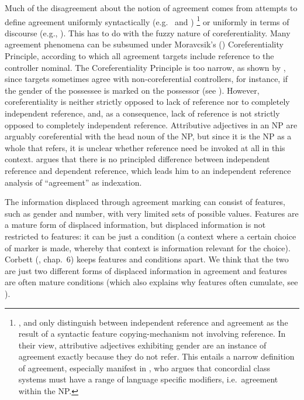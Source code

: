 \documentclass[output=collectionpaper]{langsci/langscibook}
\begin{document}
Much of the disagreement about the notion of agreement comes from attempts to define agreement uniformly syntactically (e.g.\ \citealt{Hengeveld2012} and \citealt{Passer2016b})%
\footnote{%
\cite{Hengeveld2012}, \cite{Rijn2016} and \cite{Passer2016b} only distinguish between independent reference and agreement as the result of a syntactic feature copying-mechanism not involving reference. In their view, attributive adjectives exhibiting gender are an instance of agreement exactly because they do not refer. This entails a narrow definition of agreement, especially manifest in \cite[86]{Passer2016b}, who argues that concordial class systems must have a range of language specific modifiers, i.e.\ agreement within the NP.
} %
or uniformly in terms of discourse (e.g., \citealt{Barlow1999}). This has to do with the fuzzy nature of coreferentiality. Many agreement phenomena can be subsumed under Moravcsik's (\citeyear[363]{Moravcsik1978}) Coreferentiality Principle, according to which all agreement targets include reference to the controller nominal. The Coreferentiality Principle is too narrow, as shown by \cite{Corbett2006}, since targets sometimes agree with non-coreferential controllers, for instance, if the gender of the possessee is marked on the possessor (see ). However, coreferentiality is neither strictly opposed to lack of reference nor to completely independent reference, and, as a consequence, lack of reference is not strictly opposed to completely independent reference. Attributive adjectives in an NP are arguably coreferential with the head noun of the NP, but since it is the NP as a whole that refers, it is unclear whether reference need be invoked at all in this context. \cite{Croft2013} argues that there is no principled difference between independent reference and dependent reference, which leads him to an independent reference analysis of ``agreement'' as indexation.

The information displaced through agreement marking can consist of features, such as gender and number, with very limited sets of possible values. Features are a mature form of displaced information, but displaced information is not restricted to features: it can be just a condition (a context where a certain choice of marker is made, whereby that context is information relevant for the choice). Corbett (\citeyear{Corbett2006}, chap.~6) keeps features and conditions apart. We think that the two are just two different forms of displaced information in agreement and features are often mature conditions (which also explains why features often cumulate, see ).
\end{document}
